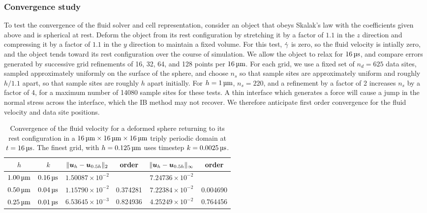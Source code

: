 \subsubsection{Convergence study}
To test the convergence of the fluid solver and cell representation, consider 
an object that obeys Skalak's law with the coefficients given above and is
spherical at rest. Deform the object from its rest configuration by stretching
it by a factor of $1.1$ in the $z$ direction and compressing it by a factor of
$1.1$ in the $y$ direction to maintain a fixed volume. For this test, $\dot{\gamma}$
is zero, so the fluid velocity is intially zero, and the object tends toward
its rest configuration over the course of simulation. We allow the object to
relax for $16\us$, and compare errors generated by successive grid refinements
of 16, 32, 64, and 128 points per $16\um$. For each grid, we use a fixed set of
$n_d=625$ data sites, sampled approximately uniformly on the surface of the
sphere, and choose $n_s$ so that sample sites are approximately uniform and
roughly $h/1.1$ apart, so that sample sites are roughly $h$ apart initially.
For $h=1\um$, $n_s=220$, and a refinement by a factor of 2 increases $n_s$ by a
factor of 4, for a maximum number of 14080 sample sites for these tests. A thin
interface which generates a force will cause a jump in the normal stress across
the interface, which the IB method may not recover. We therefore anticipate
first order convergence for the fluid velocity and data site positions.

\begin{table}
    \begin{center}
        \begingroup
        \setlength{\tabcolsep}{9pt}
        \renewcommand{\arraystretch}{1.5}
        \begin{tabular}{cc|cc|cc}
                                                                                                                 \\ \toprule
            $h$       & $k$       & $\|\boldsymbol{u}_h-\boldsymbol{u}_{0.5h}\|_2$ & order    & $\|\boldsymbol{u}_h-\boldsymbol{u}_{0.5h}\|_{\infty}$ & order    \\ \midrule
            $1.00\um$ & $0.16\us$ & $1.50087\times10^{-2}$ &          & $7.24736\times10^{-2}$        &          \\
            $0.50\um$ & $0.04\us$ & $1.15790\times10^{-2}$ & 0.374281 & $7.22384\times10^{-2}$        & 0.004690 \\
            $0.25\um$ & $0.01\us$ & $6.53645\times10^{-3}$ & 0.824936 & $4.25249\times10^{-2}$        & 0.764456 \\ \bottomrule
        \end{tabular}
        \endgroup
    \end{center}
    \caption{%
Convergence of the fluid velocity for a deformed sphere returning to its rest
configuration in a $16\um\times16\um\times16\um$ triply periodic domain at
$t=16\us$. The finest grid, with $h=0.125\um$ uses timestep $k=0.0025\us$.
    }
    \label{tab:u-convergence}
\end{table}

